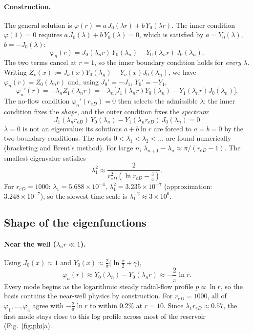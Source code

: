 \documentclass[11pt]{article}
\newcommand{\reD}{r_{eD}}
\begin{document}
\paragraph{Construction.}
The general solution is $\varphi(r)=a\,J_0(\lambda r)+b\,Y_0(\lambda r)$. The inner condition $\varphi(1)=0$
requires $a\,J_0(\lambda)+b\,Y_0(\lambda)=0$, which is satisfied by $a=Y_0(\lambda)$, $b=-J_0(\lambda)$:
\begin{equation}
  \varphi_n(r) = J_0(\lambda_n r)\,Y_0(\lambda_n) - Y_0(\lambda_n r)\,J_0(\lambda_n).
\end{equation}
The two terms cancel at $r=1$, so the inner boundary condition holds for \emph{every} $\lambda$.
Writing $Z_\nu(x) := J_\nu(x)Y_0(\lambda_n) - Y_\nu(x)J_0(\lambda_n)$, we have $\varphi_n(r)=Z_0(\lambda_n r)$ and,
using $J_0'=-J_1$, $Y_0'=-Y_1$,
\begin{equation}
  \varphi_n'(r) = -\lambda_n Z_1(\lambda_n r) = -\lambda_n\big[J_1(\lambda_n r)Y_0(\lambda_n) - Y_1(\lambda_n r)J_0(\lambda_n)\big].
\end{equation}
The no-flow condition $\varphi_n'(\reD)=0$ then selects the admissible $\lambda$: the inner condition fixes the
\emph{shape}, and the outer condition fixes the \emph{spectrum}:
\begin{equation}
  \boxed{\;J_1(\lambda_n \reD)\,Y_0(\lambda_n) - Y_1(\lambda_n \reD)\,J_0(\lambda_n) = 0\;}
  \label{eq:eig}
\end{equation}
$\lambda=0$ is not an eigenvalue: its solutions $a+b\ln r$ are forced to $a=b=0$ by the two boundary conditions.
The roots $0<\lambda_1<\lambda_2<\dots$ are found numerically (bracketing and Brent's method).
For large $n$, $\lambda_{n+1}-\lambda_n \approx \pi/(\reD-1)$. The smallest eigenvalue satisfies
\begin{equation}
  \lambda_1^2 \approx \frac{2}{\reD^2\left(\ln \reD - \tfrac34\right)}.
\end{equation}
For $\reD=1000$: $\lambda_1 = 5.688\times10^{-4}$, $\lambda_1^2 = 3.235\times10^{-7}$ (approximation: $3.248\times10^{-7}$),
so the slowest time scale is $\lambda_1^{-2}\approx 3\times 10^{6}$.

\subsection{Shape of the eigenfunctions}

\paragraph{Near the well ($\lambda_n r\ll1$).}
Using $J_0(x)\approx1$ and $Y_0(x)\approx\frac{2}{\pi}\big(\ln\frac{x}{2}+\gamma\big)$,
\begin{equation}
  \varphi_n(r) \approx Y_0(\lambda_n) - Y_0(\lambda_n r) \approx -\frac{2}{\pi}\ln r .
\end{equation}
Every mode begins as the logarithmic steady radial-flow profile $p\propto\ln r$, so the basis contains the
near-well physics by construction. For $\reD=1000$, all of $\varphi_1,\dots,\varphi_4$ agree with $-\frac{2}{\pi}\ln r$
to within $0.2\%$ at $r=10$. Since $\lambda_1\reD\approx0.57$, the first mode stays close to this log profile
across most of the reservoir (Fig.~\ref{fig:phi}a).
\end{document}
